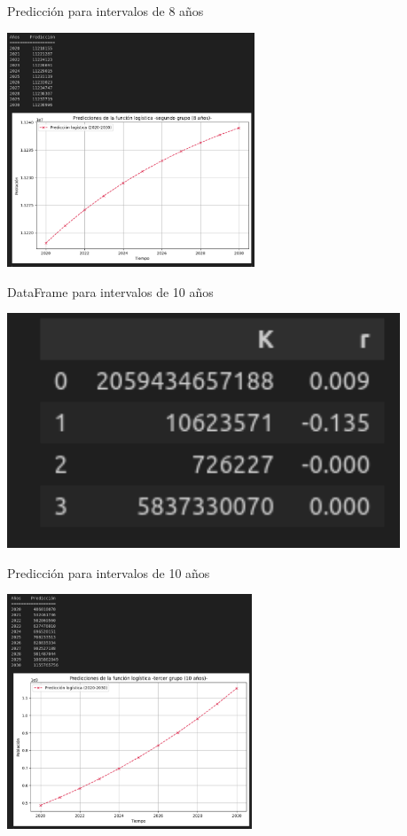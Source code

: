 \documentclass{beamer}
\begin{document}
\begin{frame}{Predicción para intervalos de 8 años}
    \begin{center}
    \includegraphics[height = 7cm]{img/df8_graph.png}
    \end{center}
\end{frame}

\begin{frame}{DataFrame para intervalos de 10 años}
    \begin{center}
    \includegraphics[height = 7cm]{img/df10.png}
    \end{center}
\end{frame} 

\begin{frame}{Predicción para intervalos de 10 años}
    \begin{center}
    \includegraphics[height = 7cm]{img/df10_graph.png}
    \end{center}
\end{frame}
\end{document}
